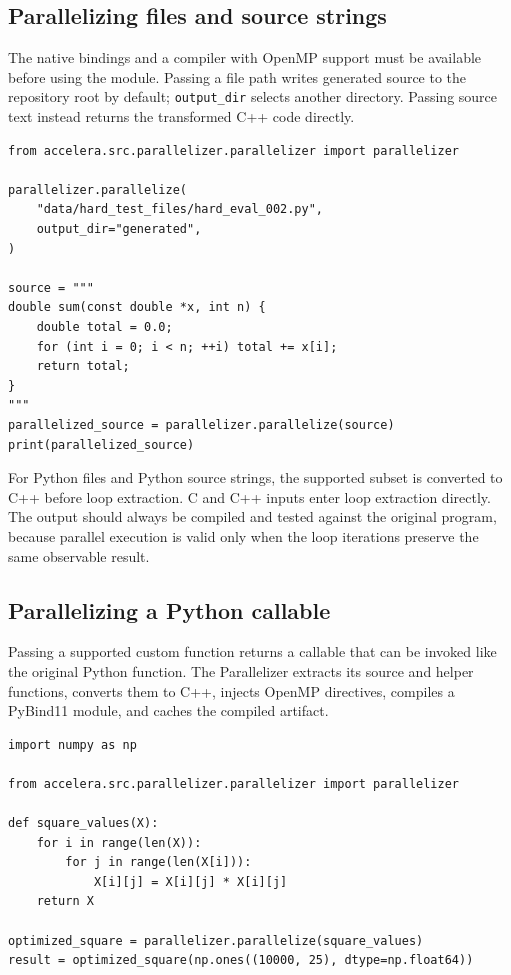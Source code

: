 \documentclass[12pt,a4paper]{report}
\begin{document}
\subsection{Parallelizing files and source strings}
The native bindings and a compiler with OpenMP support must be available before
using the module. Passing a file path writes generated source to the repository
root by default; \texttt{output\_dir} selects another directory. Passing source
text instead returns the transformed C++ code directly.

\Needspace{0.40\textheight}
\begin{lstlisting}[style=code,caption={Parallelizing a source file and a code string}]
from accelera.src.parallelizer.parallelizer import parallelizer

parallelizer.parallelize(
    "data/hard_test_files/hard_eval_002.py",
    output_dir="generated",
)

source = """
double sum(const double *x, int n) {
    double total = 0.0;
    for (int i = 0; i < n; ++i) total += x[i];
    return total;
}
"""
parallelized_source = parallelizer.parallelize(source)
print(parallelized_source)
\end{lstlisting}

For Python files and Python source strings, the supported subset is converted
to C++ before loop extraction. C and C++ inputs enter loop extraction directly.
The output should always be compiled and tested against the original program,
because parallel execution is valid only when the loop iterations preserve the
same observable result.

\subsection{Parallelizing a Python callable}
Passing a supported custom function returns a callable that can be invoked like
the original Python function. The Parallelizer extracts its source and helper
functions, converts them to C++, injects OpenMP directives, compiles a PyBind11
module, and caches the compiled artifact.

\begin{lstlisting}[style=code,caption={Compiling a custom numerical function}]
import numpy as np

from accelera.src.parallelizer.parallelizer import parallelizer

def square_values(X):
    for i in range(len(X)):
        for j in range(len(X[i])):
            X[i][j] = X[i][j] * X[i][j]
    return X

optimized_square = parallelizer.parallelize(square_values)
result = optimized_square(np.ones((10000, 25), dtype=np.float64))
\end{lstlisting}
\end{document}
